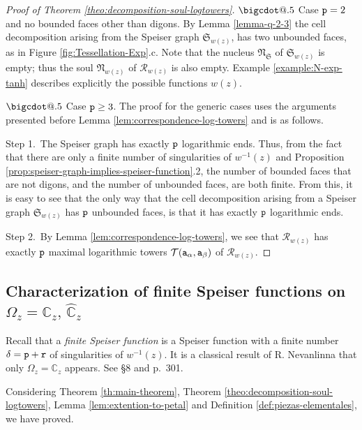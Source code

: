\documentclass[final,3p,times]{elsarticle}
\makeatletter
\newcommand{\CC}{\ensuremath{{\mathbb C}}}
\newcommand{\CW}{\ensuremath{{\widehat{\mathbb C}}}}
\newcommand{\R}{\ensuremath{{\mathcal R}}}
\newcommand*\bigcdot{\mathpalette\bigcdot@{.5}}
\newcommand*\bigcdot@[2]{\mathbin{\vcenter{\hbox{\scalebox{#2}{$\m@th#1\bullet$}}}}}
\theoremstyle{definition}
\makeatother
\begin{document}
\begin{proof}[Proof of Theorem \ref{theo:decomposition-soul-logtowers}]
\smallskip

\noindent 
$\bigcdot$ 
Case ${\tt p}=2$ and no bounded faces other than digons.
By Lemma \ref{lemma-q-2-3}
the cell decomposition arising from the 
Speiser graph $\mathfrak{S}_{w(z)}$, has two unbounded faces, 
as in Figure \ref{fig:Tessellation-Exp}.c.
Note that the nucleus $\mathfrak{N}_\mathfrak{S}$ of $\mathfrak{S}_{w(z)}$ is empty; 
thus the soul $\mathfrak{N}_{w(z)}$ of $\R_{w(z)}$ is also empty.
Example \ref{example:N-exp-tanh} describes explicitly the possible
functions $w(z)$. 

\smallskip


\noindent 
$\bigcdot$ 
Case ${\tt p}\geq 3$.
The proof for the generic cases uses the arguments presented before 
Lemma \ref{lem:correspondence-log-towers} and is as follows.

\noindent
Step 1.\
The Speiser graph
has exactly $\tt p$ logarithmic ends.
Thus, from the fact that there are only a finite number of singularities of $w^{-1}(z)$
and Proposition \ref{prop:speiser-graph-implies-speiser-function}.2, 
the number of bounded faces that are not digons, 
and the number of unbounded faces, are both finite.
From this, it is easy to see that the only way that the cell decomposition arising from a 
Speiser graph $\mathfrak{S}_{w(z)}$ has $\tt p$ unbounded faces, 
is that it has exactly $\tt p$ logarithmic ends.

\noindent
Step 2.\
By Lemma \ref{lem:correspondence-log-towers}, 
we see that $\R_{w(z)}$ has 
exactly $\tt p$ maximal logarithmic towers $\mathcal{T} ({\tt a}_\alpha, {\tt a}_\beta )$ of $\R_{w(z)}$.
\end{proof}



\subsection{Characterization of finite Speiser functions on $\Omega_z=\CC_z, \, \CW_z$}
\label{sec:caract-Speiser-finitas}
Recall that a \emph{finite Speiser function} is a Speiser function with a finite
number $\delta = {\tt p} + {\tt r}$ of singularities of $w^{-1}(z)$.
It is a classical
result of R. Nevanlinna that only $\Omega_z = \CC_z$ appears. See \cite{Nevanlinna1} \S8 
and \cite{Nevanlinna2} p.\ 301.

Considering Theorem \ref{th:main-theorem},
Theorem \ref{theo:decomposition-soul-logtowers}, 
Lemma \ref{lem:extention-to-petal} and Definition \ref{def:piezas-elementales},
we have proved.
\end{document}
